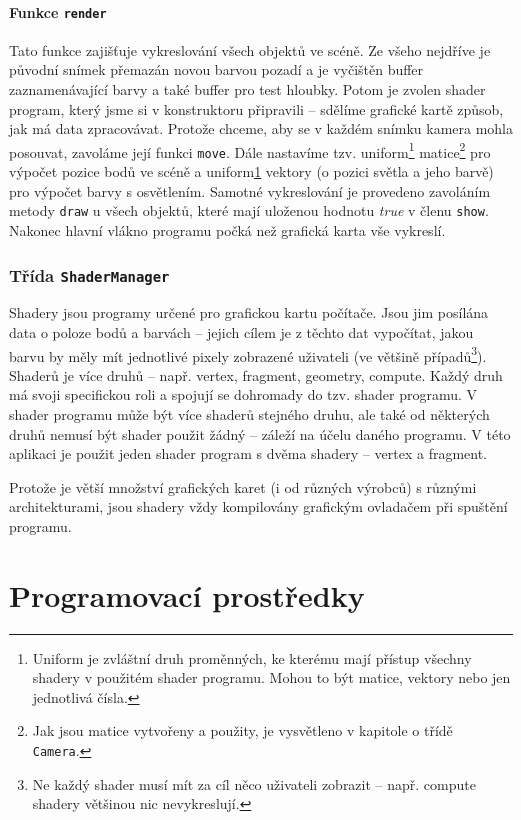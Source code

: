 \documentclass[a4paper, 12pt]{report}
\begin{document}
\subsubsection{Funkce \texttt{render}}
Tato funkce zajišťuje vykreslování všech objektů ve scéně. Ze všeho nejdříve je původní snímek přemazán novou barvou pozadí a je vyčištěn buffer zaznamenávající barvy a také buffer pro test hloubky. Potom je zvolen shader program, který jsme si v konstruktoru připravili -- sdělíme grafické kartě způsob, jak má data zpracovávat. Protože chceme, aby se v každém snímku kamera mohla posouvat, zavoláme její funkci \texttt{move}. Dále nastavíme tzv. uniform\footnote{\label{uniform}Uniform je zvláštní druh proměnných, ke kterému mají přístup všechny shadery v použitém shader programu. Mohou to být matice, vektory nebo jen jednotlivá čísla.} matice\footnote{Jak jsou matice vytvořeny a použity, je vysvětleno v kapitole o třídě \texttt{Camera}.} pro výpočet pozice bodů ve scéně a uniform\cref{uniform} vektory (o pozici světla a jeho barvě) pro výpočet barvy s osvětlením. Samotné vykreslování je provedeno zavoláním metody \texttt{draw} u všech objektů, které mají uloženou hodnotu \emph{true} v členu \texttt{show}. Nakonec hlavní vlákno programu počká než grafická karta vše vykreslí.

\subsection{Třída \texttt{ShaderManager}}
Shadery jsou programy určené pro grafickou kartu počítače. Jsou jim posílána data o poloze bodů a barvách -- jejich cílem je z těchto dat vypočítat, jakou barvu by měly mít jednotlivé pixely zobrazené uživateli (ve většině případů\footnote{Ne každý shader musí mít za cíl něco uživateli zobrazit -- např. compute shadery většinou nic nevykreslují.}). Shaderů je více druhů -- např. vertex, fragment, geometry, compute. Každý druh má svoji specifickou roli a spojují se dohromady do tzv. shader programu. V shader programu může být více shaderů stejného druhu, ale také od některých druhů nemusí být shader použit žádný -- záleží na účelu daného programu. V této aplikaci je použit jeden shader program s dvěma shadery -- vertex a fragment.

Protože je větší množství grafických karet (i od různých výrobců) s různými architekturami, jsou shadery vždy kompilovány grafickým ovladačem při spuštění programu.

\chapter{Programovací prostředky}
\end{document}
